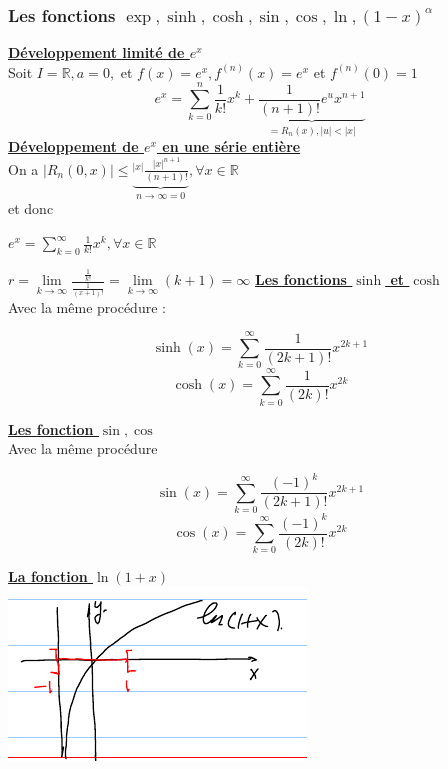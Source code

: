 \documentclass[12pt,a4paper]{article}
\newcommand{\somme}[2]{\ensuremath{\sum\limits_{#2}^{#1}}}
\newcommand{\limite}{\lim\limits_}
\newcommand{\evid}[1]{\textbf{\underline{#1}}}
\newcommand{\ninf}{\ensuremath{n \to \infty}}
\newcommand{\R}{\ensuremath{\mathbb{R}} }
\begin{document}
{\subsubsection{Les fonctions $\exp, \sinh, \cosh, \sin, \cos, \ln, (1-x)^\alpha$}
\evid{Développement limité de $e^x$}\\
Soit $I=\R, a=0,$ et $f(x) = e^x, f^{(n)}(x) = e^x$ et $f^{(n)}(0) = 1$
\begin{equation}
	e^x = \somme{n}{k=0}{\frac{1}{k!}x^k} + \underbrace{\frac{1}{(n+1)!}e^ux^{n+1}}_{=R_n(x), |u| < |x|}
\end{equation}
\evid{Développement de $e^x$ en une série entière}\\
On a $|R_n(0,x)| \leq \underbrace{^{|x|} \frac{|x|^{n+1}}{(n+1)!}}_{\ninf = 0}, \forall x \in \R$\\
et donc
\begin{boite}
$e^x = \somme{\infty}{k=0}{\frac{1}{k!}x^k}, \forall x \in \R$
\end{boite}
$r = \limite{k\to\infty}\frac{\frac{1}{k!}}{\frac{1}{(x+1)!}} = \limite{k\to\infty}(k+1) = \infty$
\evid{Les fonctions $\sinh$ et $\cosh$}\\
Avec la même procédure :
\begin{boite}
\begin{equation}
\sinh (x) = \somme{\infty}{k=0}{\frac{1}{(2k+1)!}x^{2k+1}}
\end{equation}
\begin{equation}
\cosh( x) = \somme{\infty}{k=0}{\frac{1}{(2k)!}x^{2k}}
\end{equation}
\end{boite}
\evid{Les fonction $\sin, \cos$}\\
Avec la même procédure\\
\begin{boite}
	\begin{equation}	
		\sin(x) = \somme{\infty}{k=0}{\frac{(-1)^k}{(2k+1)!}x^{2k+1}}
	\end{equation}
	\begin{equation}
		\cos(x) = \somme{\infty}{k=0}{\frac{(-1)^k}{(2k)!}x^{2k}}
	\end{equation}
\end{boite}
\evid{La fonction $\ln(1+x)$}\\
\includegraphics[scale=0.5]{illustrations_Analyse/ln_1_x}\\
}
\end{document}
